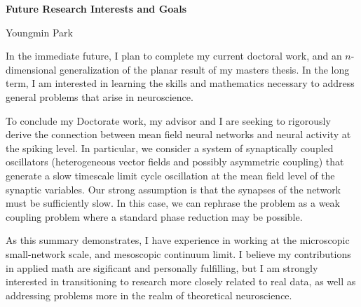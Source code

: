 \documentclass[a4paper,11pt]{article}
\begin{document}
\begin{center}
\Large \textbf{Future Research Interests and Goals}

\Large Youngmin Park
\end{center}

In the immediate future, I plan to complete my current doctoral work, and an $n$-dimensional generalization of the planar result of my masters thesis. In the long term, I am interested in learning the skills and mathematics necessary to address general problems that arise in neuroscience.

To conclude my Doctorate work, my advisor and I are seeking to rigorously derive the connection between mean field neural networks and neural activity at the spiking level. In particular, we consider a system of synaptically coupled oscillators (heterogeneous vector fields and possibly asymmetric coupling) that generate a slow timescale limit cycle oscillation at the mean field level of the synaptic variables. Our strong assumption is that the synapses of the network must be sufficiently slow. In this case, we can rephrase the problem as a weak coupling problem \cite{rubinrubin} where a standard phase reduction may be possible.

As this summary demonstrates, I have experience in working at the microscopic small-network scale, and mesoscopic continuum limit. I believe my contributions in applied math are sigificant and personally fulfilling, but I am strongly interested in transitioning to research more closely related to real data, as well as addressing problems more in the realm of theoretical neuroscience.




\end{document}
